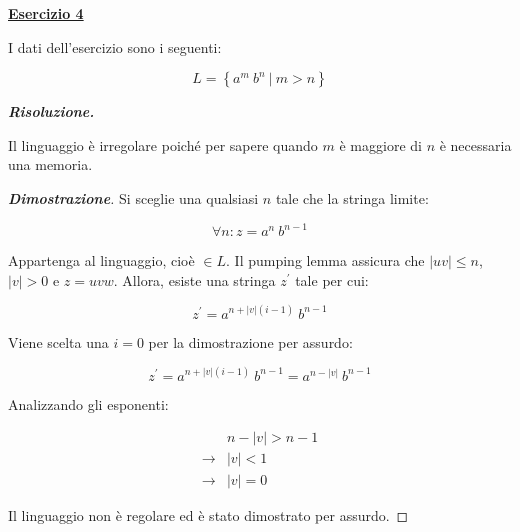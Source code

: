 \documentclass[a4paper]{article}
\begin{document}
	\newpage
	
	\noindent
	\textcolor{Red3}{\textbf{\underline{Esercizio 4}}}\newline
	
	\noindent
	I dati dell'esercizio sono i seguenti:
	
	\begin{equation*}
		L = \left\{a^{m} \: b^{n} \: \left| \: m > n \right.\right\}
	\end{equation*}\newline
	
	\noindent
	\textcolor{Green4}{\textbf{\emph{Risoluzione.}}}\newline
	
	\noindent
	Il linguaggio è irregolare poiché per sapere quando $m$ è maggiore di $n$ è necessaria una memoria.
	
	\begin{proof}[\textcolor{Blue3}{\textbf{Dimostrazione}}]
		Si sceglie una qualsiasi $n$ tale che la stringa limite:
		
		\begin{equation*}
			\forall n : z = a^{n} \: b^{n-1}
		\end{equation*}
		
		\noindent
		Appartenga al linguaggio, cioè $\in L$. Il pumping lemma assicura che $|uv| \le n$, $|v| > 0$ e $z = uvw$. Allora, esiste una stringa $z^{'}$ tale per cui:
		
		\begin{equation*}
			z^{'} = a^{n + |v|\left(i-1\right)} \: b^{n-1}
		\end{equation*}
	
		\noindent
		Viene scelta una $i = 0$ per la dimostrazione per assurdo:
		
		\begin{equation*}
			z^{'} = a^{n + |v|\left(i-1\right)} \: b^{n-1} = a^{n - |v|} \: b^{n-1}
		\end{equation*}
	
		\noindent
		Analizzando gli esponenti:
		
		\begin{equation*}
			\begin{array}{cl}
				& n - |v| > n - 1 \\
				\rightarrow & |v| < 1 \\
				\rightarrow & |v| = 0
			\end{array}
		\end{equation*}
	
		\noindent
		Il linguaggio non è regolare ed è stato dimostrato per assurdo.
	\end{proof}
\end{document}
